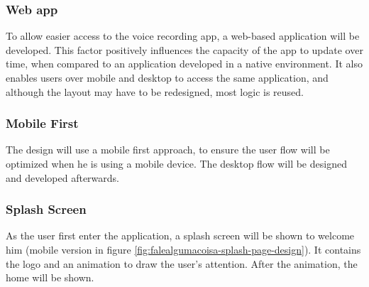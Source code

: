 \subsubsection{Web app}

To allow easier access to the voice recording app, a web-based application will be developed. This factor positively influences the capacity of the app to update over time, when compared to an application developed in a native environment. It also enables users over mobile and desktop to access the same application, and although the layout may have to be redesigned, most logic is reused.

\subsubsection{Mobile First}

The design will use a mobile first approach, to ensure the user flow will be optimized when he is using a mobile device. The desktop flow will be designed and developed afterwards.

\subsubsection{Splash Screen}

As the user first enter the application, a splash screen will be shown to welcome him (mobile version in figure \ref{fig:falealgumacoisa-splash-page-design}). It contains the logo and an animation to draw the user's attention. After the animation, the home will be shown.

